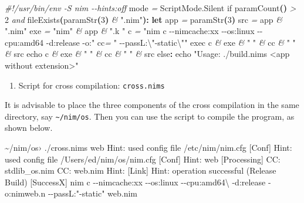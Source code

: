 \documentclass[
  12pt,
]{book}
\newenvironment{Shaded}{}{}
\newcommand{\CommentTok}[1]{\textcolor[rgb]{0.38,0.63,0.69}{\textit{#1}}}
\newcommand{\DataTypeTok}[1]{\textcolor[rgb]{0.56,0.13,0.00}{#1}}
\newcommand{\DecValTok}[1]{\textcolor[rgb]{0.25,0.63,0.44}{#1}}
\newcommand{\KeywordTok}[1]{\textcolor[rgb]{0.00,0.44,0.13}{\textbf{#1}}}
\newcommand{\NormalTok}[1]{#1}
\newcommand{\StringTok}[1]{\textcolor[rgb]{0.25,0.44,0.63}{#1}}
\providecommand{\tightlist}{%
  \setlength{\itemsep}{0pt}\setlength{\parskip}{0pt}}
\begin{document}
\begin{Shaded}
\begin{Highlighting}[]
\CommentTok{\#!/usr/bin/env {-}S nim {-}{-}hints:off}
\NormalTok{mode }\CommentTok{=} \DataTypeTok{ScriptMode.Silent}
\DataTypeTok{if} \DataTypeTok{paramCount}\KeywordTok{()} \CommentTok{\textgreater{}} \DecValTok{2} \CommentTok{and} \DataTypeTok{fileExists}\KeywordTok{(}\DataTypeTok{paramStr}\KeywordTok{(}\DecValTok{3}\KeywordTok{)} \CommentTok{\&} \StringTok{".nim"}\KeywordTok{):} 
  \KeywordTok{let}
\NormalTok{    app }\CommentTok{=} \DataTypeTok{paramStr}\KeywordTok{(}\DecValTok{3}\KeywordTok{)}
\NormalTok{    src }\CommentTok{=}\NormalTok{ app }\CommentTok{\&} \StringTok{".nim"}
\NormalTok{    exe }\CommentTok{=} \StringTok{"nim"} \CommentTok{\&}\NormalTok{ app }\CommentTok{\&} \StringTok{".k "}
\NormalTok{    c }\CommentTok{=} \StringTok{"nim c {-}{-}nimcache:xx {-}{-}os:linux {-}{-}cpu:amd64 {-}d:release {-}o:"}
\NormalTok{    cc}\CommentTok{=} \StringTok{" {-}{-}passL:}\NormalTok{\textbackslash{}"}\StringTok{{-}static}\NormalTok{\textbackslash{}"}\StringTok{"}
  \DataTypeTok{exec}\NormalTok{ c }\CommentTok{\&}\NormalTok{ exe }\CommentTok{\&} \StringTok{" "} \CommentTok{\&}\NormalTok{ cc }\CommentTok{\&} \StringTok{" "} \CommentTok{\&}\NormalTok{ src}
  \DataTypeTok{echo}\NormalTok{ c }\CommentTok{\&}\NormalTok{ exe }\CommentTok{\&} \StringTok{" "} \CommentTok{\&}\NormalTok{ cc }\CommentTok{\&} \StringTok{" "} \CommentTok{\&}\NormalTok{ src}
\DataTypeTok{else}\KeywordTok{:} \DataTypeTok{echo} \StringTok{"Usage: ./build.nims \textless{}app without extension\textgreater{}"}
\end{Highlighting}
\end{Shaded}

\begin{enumerate}
\def\labelenumi{(\arabic{enumi})}
\setcounter{enumi}{10}
\tightlist
\item
  Script for cross compilation: \texttt{cross.nims}
\end{enumerate}

It is advisable to place the three components of the cross compilation
in the same directory, say \texttt{\textasciitilde{}/nim/os}. Then you
can use the script to compile the program, as shown below.

\begin{Shaded}
\begin{Highlighting}[]
\NormalTok{\textasciitilde{}/nim/os› ./cross.nims web}
\NormalTok{Hint: used config file \textquotesingle{}/etc/nim/nim.cfg\textquotesingle{} [Conf]}
\NormalTok{Hint: used config file \textquotesingle{}/Users/ed/nim/os/nim.cfg\textquotesingle{} [Conf]}
\NormalTok{Hint: web [Processing]}
\NormalTok{CC: stdlib\_os.nim}
\NormalTok{CC: web.nim}
\NormalTok{Hint:  [Link]}
\NormalTok{Hint: operation successful (Release Build) [SuccessX]}
\NormalTok{nim c {-}{-}nimcache:xx {-}{-}os:linux {-}{-}cpu:amd64\textbackslash{}}
\NormalTok{  {-}d:release {-}o:nimweb.n   {-}{-}passL:"{-}static" web.nim}
\end{Highlighting}
\end{Shaded}
\end{document}
